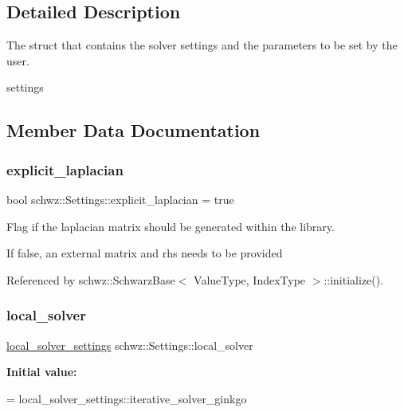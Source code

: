 \subsection{Detailed Description}
The struct that contains the solver settings and the parameters to be set by the user. 

settings 

\subsection{Member Data Documentation}
\mbox{\label{structschwz_1_1Settings_a2af5f07901df047e305c456b2f97e774}} 
\subsubsection{\texorpdfstring{explicit\+\_\+laplacian}{explicit\_laplacian}}
{\footnotesize\ttfamily bool schwz\+::\+Settings\+::explicit\+\_\+laplacian = true}



Flag if the laplacian matrix should be generated within the library. 

If false, an external matrix and rhs needs to be provided 

Referenced by schwz\+::\+Schwarz\+Base$<$ Value\+Type, Index\+Type $>$\+::initialize().

\mbox{\label{structschwz_1_1Settings_a8028fcf029fadc07a7d1b9aa94c83f08}} 
\subsubsection{\texorpdfstring{local\+\_\+solver}{local\_solver}}
{\footnotesize\ttfamily \hyperlink{structschwz_1_1Settings_a31e82310ef6aed08168baef78f0db69e}{local\+\_\+solver\+\_\+settings} schwz\+::\+Settings\+::local\+\_\+solver}

{\bfseries Initial value\+:}
\begin{DoxyCode}
=
        local\_solver\_settings::iterative\_solver\_ginkgo
\end{DoxyCode}
\mbox{\label{structschwz_1_1Settings_a75a2ff3778c7334382a6c74553dbd5b4}} 
